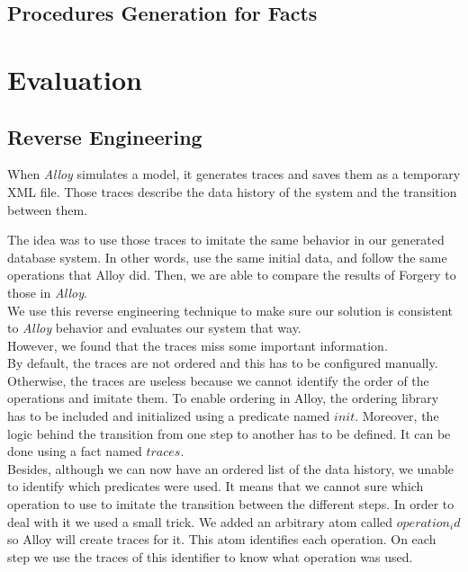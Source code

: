 \documentclass[oneside]{book}
\begin{document}
\newpage

\subsection{Procedures Generation for Facts}

\newpage

\section{Evaluation}
\label{sec:evaluation}

\subsection{Reverse Engineering}
When \textit{Alloy} simulates a model, it generates traces and saves them as a temporary XML file. Those traces describe the data history of the system and the transition between them. 

The idea was to use those traces to imitate the same behavior in our generated database system. In other words, use the same initial data, and follow the same operations that Alloy did. Then, we are able to compare the results of Forgery to those in \textit{Alloy}.\\

We use this reverse engineering technique to make sure our solution is consistent to \textit{Alloy} behavior and evaluates our system that way.\\

However, we found that the traces miss some important information.\\ 

By default, the traces are not ordered and this has to be configured manually. Otherwise, the traces are useless because we cannot identify the order of the operations and imitate them. To enable ordering in Alloy, the ordering library has to be included and initialized using a predicate named $init$. Moreover, the logic behind the transition from one step to another has to be defined. It can be done using a fact named $traces$.\\ 

Besides, although we can now have an ordered list of the data history, we unable to identify which predicates were used. It means that we cannot sure which operation to use to imitate the transition between the different steps. In order to deal with it we used a small trick. We added an arbitrary atom called $operation_id$ so Alloy will create traces for it. This atom identifies each operation. On each step we use the traces of this identifier to know what operation was used.\\
\end{document}
